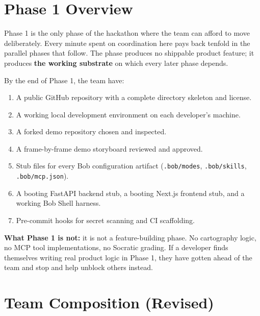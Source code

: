 \documentclass[11pt,letterpaper]{article}
\begin{document}
{\hypersetup{linkcolor=ibmdark}\tableofcontents}
\newpage

\section{Phase 1 Overview}

Phase 1 is the only phase of the hackathon where the team can afford to move deliberately. Every minute spent on coordination here pays back tenfold in the parallel phases that follow. The phase produces no shippable product feature; it produces \textbf{the working substrate} on which every later phase depends.

By the end of Phase 1, the team \shall{} have:

\begin{enumerate}
  \item A public GitHub repository with a complete directory skeleton and license.
  \item A working local development environment on each developer's machine.
  \item A forked demo repository chosen and inspected.
  \item A frame-by-frame demo storyboard reviewed and approved.
  \item Stub files for every Bob configuration artifact (\texttt{.bob/modes}, \texttt{.bob/skills}, \texttt{.bob/mcp.json}).
  \item A booting FastAPI backend stub, a booting Next.js frontend stub, and a working Bob Shell harness.
  \item Pre-commit hooks for secret scanning and CI scaffolding.
\end{enumerate}

\textbf{What Phase 1 is not:} it is not a feature-building phase. No cartography logic, no MCP tool implementations, no Socratic grading. If a developer finds themselves writing real product logic in Phase 1, they have gotten ahead of the team and \shall{} stop and help unblock others instead.

\section{Team Composition (Revised)}
\end{document}
